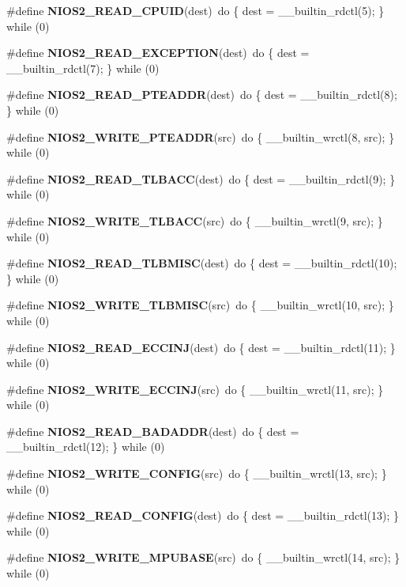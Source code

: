\begin{DoxyCompactItemize}
\item 
\#define {\bf N\+I\+O\+S2\+\_\+\+R\+E\+A\+D\+\_\+\+C\+P\+U\+ID}(dest)~do \{ dest = \+\_\+\+\_\+builtin\+\_\+rdctl(5); \} while (0)
\item 
\#define {\bf N\+I\+O\+S2\+\_\+\+R\+E\+A\+D\+\_\+\+E\+X\+C\+E\+P\+T\+I\+ON}(dest)~do \{ dest = \+\_\+\+\_\+builtin\+\_\+rdctl(7); \} while (0)
\item 
\#define {\bf N\+I\+O\+S2\+\_\+\+R\+E\+A\+D\+\_\+\+P\+T\+E\+A\+D\+DR}(dest)~do \{ dest = \+\_\+\+\_\+builtin\+\_\+rdctl(8); \} while (0)
\item 
\#define {\bf N\+I\+O\+S2\+\_\+\+W\+R\+I\+T\+E\+\_\+\+P\+T\+E\+A\+D\+DR}(src)~do \{ \+\_\+\+\_\+builtin\+\_\+wrctl(8, src); \} while (0)
\item 
\#define {\bf N\+I\+O\+S2\+\_\+\+R\+E\+A\+D\+\_\+\+T\+L\+B\+A\+CC}(dest)~do \{ dest = \+\_\+\+\_\+builtin\+\_\+rdctl(9); \} while (0)
\item 
\#define {\bf N\+I\+O\+S2\+\_\+\+W\+R\+I\+T\+E\+\_\+\+T\+L\+B\+A\+CC}(src)~do \{ \+\_\+\+\_\+builtin\+\_\+wrctl(9, src); \} while (0)
\item 
\#define {\bf N\+I\+O\+S2\+\_\+\+R\+E\+A\+D\+\_\+\+T\+L\+B\+M\+I\+SC}(dest)~do \{ dest = \+\_\+\+\_\+builtin\+\_\+rdctl(10); \} while (0)
\item 
\#define {\bf N\+I\+O\+S2\+\_\+\+W\+R\+I\+T\+E\+\_\+\+T\+L\+B\+M\+I\+SC}(src)~do \{ \+\_\+\+\_\+builtin\+\_\+wrctl(10, src); \} while (0)
\item 
\#define {\bf N\+I\+O\+S2\+\_\+\+R\+E\+A\+D\+\_\+\+E\+C\+C\+I\+NJ}(dest)~do \{ dest = \+\_\+\+\_\+builtin\+\_\+rdctl(11); \} while (0)
\item 
\#define {\bf N\+I\+O\+S2\+\_\+\+W\+R\+I\+T\+E\+\_\+\+E\+C\+C\+I\+NJ}(src)~do \{ \+\_\+\+\_\+builtin\+\_\+wrctl(11, src); \} while (0)
\item 
\#define {\bf N\+I\+O\+S2\+\_\+\+R\+E\+A\+D\+\_\+\+B\+A\+D\+A\+D\+DR}(dest)~do \{ dest = \+\_\+\+\_\+builtin\+\_\+rdctl(12); \} while (0)
\item 
\#define {\bf N\+I\+O\+S2\+\_\+\+W\+R\+I\+T\+E\+\_\+\+C\+O\+N\+F\+IG}(src)~do \{ \+\_\+\+\_\+builtin\+\_\+wrctl(13, src); \} while (0)
\item 
\#define {\bf N\+I\+O\+S2\+\_\+\+R\+E\+A\+D\+\_\+\+C\+O\+N\+F\+IG}(dest)~do \{ dest = \+\_\+\+\_\+builtin\+\_\+rdctl(13); \} while (0)
\item 
\#define {\bf N\+I\+O\+S2\+\_\+\+W\+R\+I\+T\+E\+\_\+\+M\+P\+U\+B\+A\+SE}(src)~do \{ \+\_\+\+\_\+builtin\+\_\+wrctl(14, src); \} while (0)
\item 

\end{DoxyCompactItemize}
